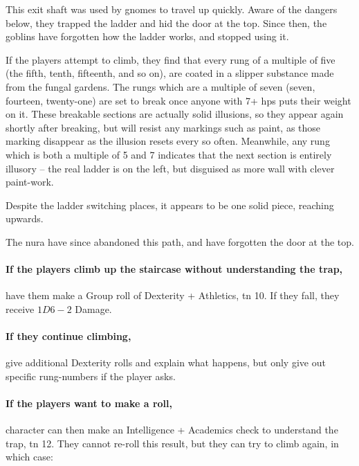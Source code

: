 \begin{multicols}{2}
\begin{exampletext}
  This exit shaft was used by gnomes to travel up quickly.
  Aware of the dangers below, they trapped the ladder and hid the door at the top.
  Since then, the goblins have forgotten how the ladder works, and stopped using it.

\end{exampletext}

If the players attempt to climb, they find that every rung of a multiple of five (the fifth, tenth, fifteenth, and so on), are coated in a slipper substance made from the fungal gardens.
The rungs which are a multiple of seven (seven, fourteen, twenty-one) are set to break once anyone with 7+ \glspl{hp} puts their weight on it.
These breakable sections are actually solid illusions, so they appear again shortly after breaking, but will resist any markings such as paint, as those marking disappear as the illusion resets every so often.
Meanwhile, any rung which is both a multiple of 5 and 7 indicates that the next section is entirely illusory -- the real ladder is on the left, but disguised as more wall with clever paint-work.

Despite the ladder switching places, it appears to be one solid piece, reaching upwards.

The nura have since abandoned this path, and have forgotten the door at the top.

\paragraph{If the players climb up the staircase without understanding the trap,}
have them make a Group roll of Dexterity + Athletics, \gls{tn} 10.%
If they fall, they receive $1D6-2$ Damage.

\paragraph{If they continue climbing,}
give additional Dexterity rolls and explain what happens, but only give out specific rung-numbers if the player asks.

\paragraph{If the players want to make a roll,}
character can then make an Intelligence + Academics check to understand the trap, \gls{tn} 12.
They cannot re-roll this result, but they can try to climb again, in which case:

\begin{itemize}


\end{itemize}
\end{multicols}
